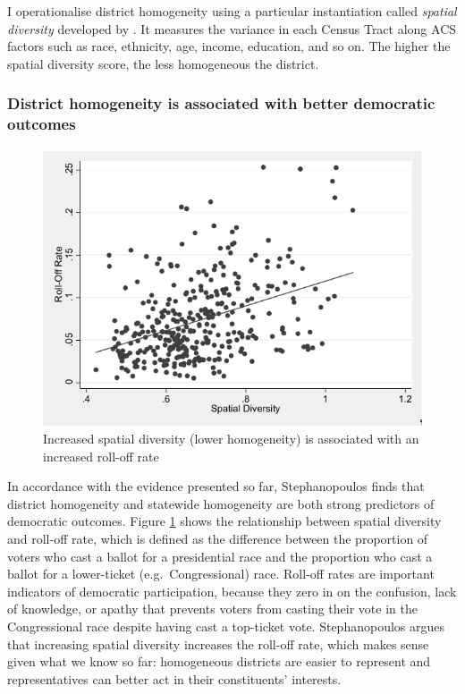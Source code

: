 \documentclass[]{article}
\begin{document}
I operationalise district homogeneity using a particular instantiation
called \emph{spatial diversity} developed by \cite{steph2012}. It
measures the variance in each Census Tract along ACS factors such as
race, ethnicity, age, income, education, and so on. The higher the
spatial diversity score, the less homogeneous the district.

\hypertarget{district-homogeneity-is-associated-with-better-democratic-outcomes}{%
\subsubsection{District homogeneity is associated with better democratic
outcomes}\label{district-homogeneity-is-associated-with-better-democratic-outcomes}}

\begin{figure}
\centering
\includegraphics{img/sd_rolloff.png}
\caption{Increased spatial diversity (lower homogeneity) is associated
with an increased roll-off rate \label{sd_rolloff}}
\end{figure}

In accordance with the evidence presented so far, Stephanopoulos finds
that district homogeneity and statewide homogeneity are both strong
predictors of democratic outcomes. Figure \ref{sd_rolloff} shows the
relationship between spatial diversity and roll-off rate, which is
defined as the difference between the proportion of voters who cast a
ballot for a presidential race and the proportion who cast a ballot for
a lower-ticket (e.g.~Congressional) race. Roll-off rates are important
indicators of democratic participation, because they zero in on the
confusion, lack of knowledge, or apathy that prevents voters from
casting their vote in the Congressional race despite having cast a
top-ticket vote. Stephanopoulos argues that increasing spatial diversity
increases the roll-off rate, which makes sense given what we know so
far: homogeneous districts are easier to represent and representatives
can better act in their constituents' interests.
\end{document}
